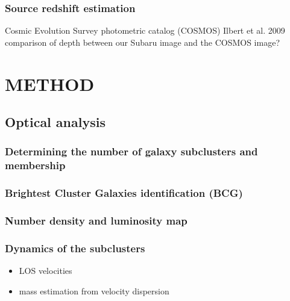 \documentclass[letterpaper,useAMS,usenatbib]{mn2e}
\begin{document}
\subsubsection{Source redshift estimation}
Cosmic Evolution Survey photometric catalog (COSMOS) 
Ilbert et al. 2009
comparison of depth between our Subaru image and the COSMOS image?

\section{METHOD}

\subsection{Optical analysis}
\subsubsection{Determining the number of galaxy subclusters and membership}
\subsubsection{Brightest Cluster Galaxies identification (BCG)}
\subsubsection{Number density and luminosity map}

% 
% 
% 

\subsubsection{Dynamics of the subclusters}
\begin{itemize}
		\item LOS velocities
		\item mass estimation from velocity dispersion 
\end{itemize}
\end{document}
